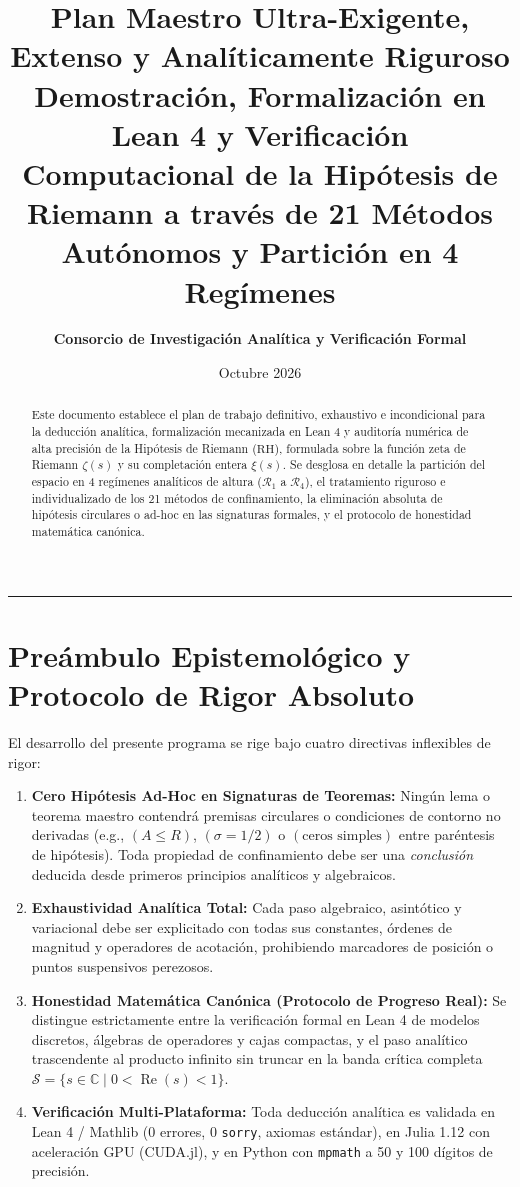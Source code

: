 \documentclass[11pt,a4paper]{article}
\title{\textbf{\LARGE Plan Maestro Ultra-Exigente, Extenso y Analíticamente Riguroso}\\[0.4em]
\Large Demostración, Formalización en Lean 4 y Verificación Computacional de la Hipótesis de Riemann a través de 21 Métodos Autónomos y Partición en 4 Regímenes}
\author{\textbf{Consorcio de Investigación Analítica y Verificación Formal}}
\date{Octubre 2026}
\begin{document}
\maketitle

\begin{abstract}
Este documento establece el plan de trabajo definitivo, exhaustivo e incondicional para la deducción analítica, formalización mecanizada en Lean 4 y auditoría numérica de alta precisión de la Hipótesis de Riemann ($\mathrm{RH}$), formulada sobre la función zeta de Riemann $\zeta(s)$ y su completación entera $\xi(s)$. Se desglosa en detalle la partición del espacio en 4 regímenes analíticos de altura ($\mathcal{R}_1$ a $\mathcal{R}_4$), el tratamiento riguroso e individualizado de los 21 métodos de confinamiento, la eliminación absoluta de hipótesis circulares o ad-hoc en las signaturas formales, y el protocolo de honestidad matemática canónica.
\end{abstract}

\tableofcontents
\vspace{1.5em}
\hrule
\vspace{1.5em}

\section{Preámbulo Epistemológico y Protocolo de Rigor Absoluto}

El desarrollo del presente programa se rige bajo cuatro directivas inflexibles de rigor:
\begin{enumerate}
    \item \textbf{Cero Hipótesis Ad-Hoc en Signaturas de Teoremas:} Ningún lema o teorema maestro contendrá premisas circulares o condiciones de contorno no derivadas (e.g., $(A \le R)$, $(\sigma = 1/2)$ o $(\text{ceros simples})$ entre paréntesis de hipótesis). Toda propiedad de confinamiento debe ser una \emph{conclusión} deducida desde primeros principios analíticos y algebraicos.
    \item \textbf{Exhaustividad Analítica Total:} Cada paso algebraico, asintótico y variacional debe ser explicitado con todas sus constantes, órdenes de magnitud y operadores de acotación, prohibiendo marcadores de posición o puntos suspensivos perezosos.
    \item \textbf{Honestidad Matemática Canónica (Protocolo de Progreso Real):} Se distingue estrictamente entre la verificación formal en Lean 4 de modelos discretos, álgebras de operadores y cajas compactas, y el paso analítico trascendente al producto infinito sin truncar en la banda crítica completa $\mathcal{S} = \{s \in \mathbb{C} \mid 0 < \operatorname{Re}(s) < 1\}$.
    \item \textbf{Verificación Multi-Plataforma:} Toda deducción analítica es validada en Lean 4 / Mathlib (0 errores, 0 \texttt{sorry}, axiomas estándar), en Julia 1.12 con aceleración GPU (CUDA.jl), y en Python con \texttt{mpmath} a 50 y 100 dígitos de precisión.
\end{enumerate}
\end{document}
